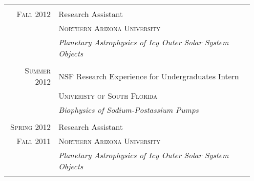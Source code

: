 \documentclass[letterpaper,10pt]{article} %
\begin{document}
\begin{tabular}{r|p{11cm}}
%
%
%
%
%
\multicolumn{2}{c}{}\\


\textsc{Fall 2012} & Research Assistant \\
& \textsc{Northern Arizona University} \\
&\emph{Planetary Astrophysics of Icy Outer Solar System Objects}\\ 

\multicolumn{2}{c}{} \\


\textsc{Summer 2012} & NSF Research Experience for Undergraduates Intern \\
 & \textsc{Univeristy of South Florida} \\

&\emph{Biophysics of Sodium-Postassium Pumps}\\ 

\multicolumn{2}{c}{} \\


\textsc{Spring 2012} & Research Assistant \\
\textsc{Fall 2011} & \textsc{Northern Arizona University} \\
&\emph{Planetary Astrophysics of Icy Outer Solar System Objects}\\ 

\multicolumn{2}{c}{} \\


\end{tabular}
\end{document}
